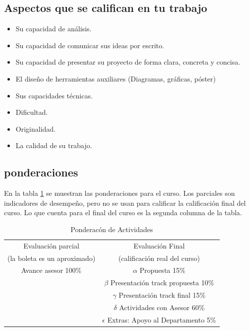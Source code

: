 \documentclass[letterpaper, 10 pt, conference]{ieeeconf}  %
\begin{document}
\subsection{Aspectos que se califican en tu trabajo}
\begin {itemize}
	\item Su capacidad de análisis.
    \item Su capacidad de comunicar sus ideas por escrito.
    \item Su capacidad de presentar su proyecto de forma clara, concreta y concisa.
    \item El diseño de herramientas auxiliares (Diagramas, gráficas, póster)
    \item Sus capacidades técnicas.
    \item Dificultad.
    \item Originalidad.
    \item La calidad de su trabajo.
\end {itemize}

\subsection{ponderaciones}

En la tabla \ref{t1}  se muestran las ponderaciones para el curso. Los parciales son indicadores de desempeño, pero no se usan para calificar la calificación final del curso. Lo que cuenta para el final del curso es la segunda columna de la tabla.   

\begin{table}[h]
  \caption{Ponderacón de Actividades}
  \label{t1}
  \begin{center}
    \begin{tabular}{|c||c|}
      \hline
        Evaluación parcial & Evaluación Final \\ 
        (la boleta es un aproximado) & (calificación real del curso) \\
      \hline
        Avance asesor  100\%  &  \(\alpha\) Propuesta 15\% \\
        & \(\beta\) Presentación track propuesta 10\% \\
        & \(\gamma\) Presentación track final 15\% \\
        & \(\delta\) Actividades con Asesor  60\% \\
        & \(\epsilon\) Extras: Apoyo al Departamento 5\% \\
       \hline
    \end{tabular}
  \end{center}
\end{table}
\end{document}
